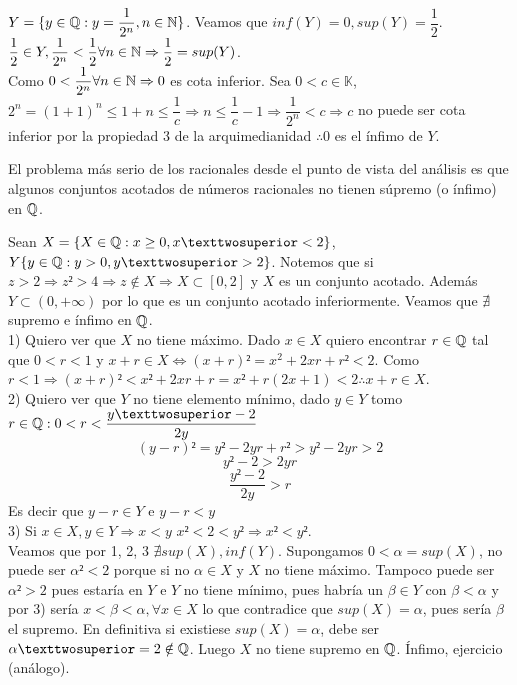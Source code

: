 \begin{eg}
    $Y = \{ y \in \mathbb{Q} : y=\dfrac{1}{2^n}, n\in \mathbb{N} \}$. Veamos que $inf(Y) =0, sup(Y) = \dfrac12$. \\
    $\dfrac{1}{2} \in Y, \dfrac{1}{2^n}<\dfrac{1}{2} \forall n \in \mathbb{N} \Rightarrow \dfrac{1}{2} = sup(Y)$. \\
    
    Como $0 < \dfrac{1}{2^n} \forall n \in \mathbb{N} \Rightarrow 0$ es cota inferior. Sea $0<c \in \mathbb{K}$, $2^n = (1+1)^n \leq 1+n \leq \dfrac{1}{c} \Rightarrow n \leq \dfrac{1}{c} -1 \Rightarrow \dfrac{1}{2^n} < c \Rightarrow c$ no puede ser cota inferior por la propiedad 3 de la arquimedianidad $\therefore 0$ es el ínfimo de $Y$. 
\end{eg}

El problema más serio de los racionales desde el punto de vista del análisis es que algunos conjuntos acotados de números racionales no tienen súpremo (o ínfimo) en $\mathbb{Q}$.

\begin{eg}
    Sean $X = \{ X \in \Q : x \geq 0, x² < 2 \}$,
    $Y \{ y \in \Q : y>0, y² > 2 \}$. Notemos que si $z>2 \Rightarrow z² > 4 \Rightarrow z \notin X \Rightarrow X \subset [0, 2]$ y $X$ es un conjunto acotado. Además $Y \subset (0, +\infty)$ por lo que es un conjunto acotado inferiormente. Veamos que $\nexists$ supremo e ínfimo en $\mathbb{Q}$. \\
    
    1) Quiero ver que $X$ no tiene máximo. Dado $x \in X$ quiero encontrar $r \in \mathbb{Q}$ tal que $0<r<1$ y $x+r \in X \iff (x+r)² =x^2+2xr+r² < 2$. Como $r<1 \Rightarrow (x+r)²<x²+2xr+r=x²+r(2x+1)<2 \therefore x+r \in X$. \\
    2) Quiero ver que $Y$ no tiene elemento mínimo, dado $y \in Y$ tomo $r \in \Q : 0 < r < \dfrac{y²-2}{2y}$
    \begin{equation}
        (y-r)²=y²-2yr+r²>y²-2yr>2
    \end{equation}
    \begin{equation}
        y²-2 > 2yr
    \end{equation}
    \begin{equation}
        \dfrac{y²-2}{2y}>r
    \end{equation}
    Es decir que $y-r \in Y$ e $y-r < y$ \\
    
    3) Si $x \in X, y \in Y \Rightarrow x < y$
    $x² < 2 < y² \Rightarrow x² < y²$. \\

    Veamos que por 1, 2, 3 $\nexists sup(X), inf(Y)$. Supongamos $0< \alpha = sup(X)$, no puede ser $\alpha²<2$ porque si no $\alpha \in X$ y $X$ no tiene máximo. Tampoco puede ser $\alpha² > 2$ pues estaría en $Y$ e $Y$ no tiene mínimo, pues habría un $\beta \in Y$ con $\beta < \alpha$ y por 3) sería $x < \beta < \alpha, \forall x \in X$ lo que contradice que $sup(X) = \alpha$, pues sería $\beta$ el supremo.
    En definitiva si existiese $sup(X) = \alpha$, debe ser $\alpha² = 2 \notin \Q$. Luego $X$ no tiene supremo en $\mathbb{Q}$.
    Ínfimo, ejercicio (análogo).
\end{eg}

